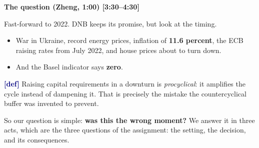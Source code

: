 {\small\textbf{The question (Zheng, 1:00) [3:30–4:30]}}\par\smallskip
Fast-forward to 2022. DNB keeps its promise, but look at the timing.
\begin{itemize}\setlength\itemsep{0pt}
\item War in Ukraine, record energy prices, inflation of \textbf{11.6 percent}, the ECB raising rates from July 2022, and house prices about to turn down.
\item And the Basel indicator says \textbf{zero}.
\end{itemize}
\par\smallskip
\textcolor{navy}{\textbf{[def]}} Raising capital requirements in a downturn is \emph{procyclical}: it amplifies the cycle instead of dampening it. That is precisely the mistake the countercyclical buffer was invented to prevent.
\par\smallskip
So our question is simple: \textbf{was this the wrong moment?} We answer it in three acts, which are the three questions of the assignment: the setting, the decision, and its consequences.
